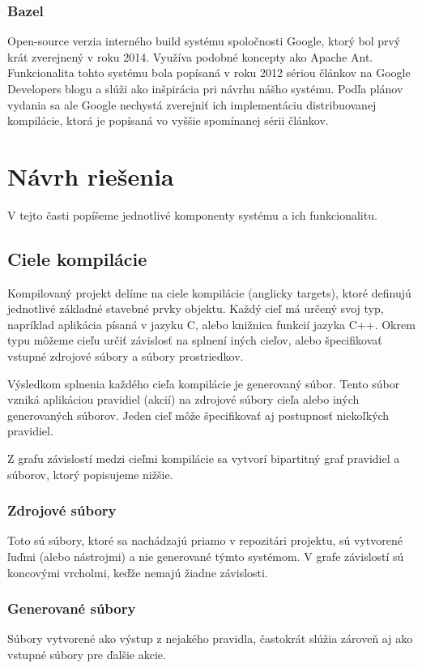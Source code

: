 \subsubsection{Bazel}
Open-source verzia interného build systému spoločnosti Google, ktorý bol prvý krát
zverejnený v roku 2014. Využíva podobné koncepty ako Apache Ant. Funkcionalita tohto
systému bola popísaná v roku 2012 sériou článkov na Google Developers blogu
\cite{BlazeDesign} a slúži ako inšpirácia pri návrhu nášho systému. Podľa plánov
vydania \cite{BazelRoadmap} sa ale Google nechystá zverejniť ich implementáciu
distribuovanej kompilácie, ktorá je popísaná vo vyššie spomínanej sérii článkov.

\section{N\'{a}vrh rie\v{s}enia}
\label{sec:solution}
V tejto časti popíšeme jednotlivé komponenty systému a ich funkcionalitu.

\subsection{Ciele kompil\'{a}cie}
\label{sub:solution:targets}

Kompilovaný projekt delíme na ciele kompilácie (anglicky targets), ktoré definujú
jednotlivé základné stavebné prvky objektu. Každý cieľ má určený svoj typ, napríklad
aplikácia písaná v jazyku C, alebo knižnica funkcií jazyka C++. Okrem typu môžeme
cieľu určiť závislosť na splnení iných cieľov, alebo špecifikovať vstupné zdrojové
súbory a súbory prostriedkov.

Výsledkom splnenia každého cieľa kompilácie je generovaný súbor. Tento súbor vzniká
aplikáciou pravidiel (akcií) na zdrojové súbory cieľa alebo iných generovaných súborov.
Jeden cieľ môže špecifikovať aj postupnosť niekoľkých pravidiel.

Z grafu závislostí medzi cieľmi kompilácie sa vytvorí bipartitný graf pravidiel a súborov,
ktorý popisujeme nižšie.

\subsubsection{Zdrojové súbory}
Toto sú súbory, ktoré sa nachádzajú priamo v repozitári projektu, sú vytvorené
ľuďmi (alebo nástrojmi) a nie generované týmto systémom. V grafe závislostí sú
koncovými vrcholmi, keďže nemajú žiadne závislosti.

\subsubsection{Generované súbory}
Súbory vytvorené ako výstup z nejakého pravidla, častokrát slúžia zároveň aj ako
vstupné súbory pre ďalšie akcie.

